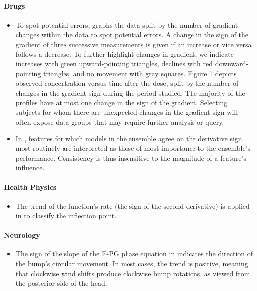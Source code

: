 \documentclass[11pt]{book}
\begin{document}
\paragraph{Drugs}
\begin{itemize}
\item To spot potential errors, \cite{dykstra2010visualization}
graphs the data split by the number of gradient changes within the
data to spot potential errors. A change in the sign of the gradient
of three successive measurements is given if an increase or vice versa
follows a decrease. To further highlight changes in gradient, we indicate
increases with green upward-pointing triangles, declines with red
downward-pointing triangles, and no movement with gray squares. Figure
1 depicts observed concentration versus time after the dose, split
by the number of changes in the gradient sign during the period studied.
The majority of the profiles have at most one change in the sign of
the gradient. Selecting subjects for whom there are unexpected changes
in the gradient sign will often expose data groups that may require
further analysis or query.
\item In \cite{brown2021general},
features for which models in the ensemble agree on the derivative
sign most routinely are interpreted as those of most importance to
the ensemble's performance. Consistency is thus insensitive
to the magnitude of a feature's influence.
\end{itemize}
\paragraph{Health Physics}
\begin{itemize}
\item The trend of the function's rate (the sign of the second derivative)
is applied in \cite{shende2019determination}
to classify the inflection point.
\end{itemize}
\paragraph{Neurology}
\begin{itemize}
\item The sign of the slope of the E-PG phase equation in \cite{okubo2020neural}
indicates the direction of the bump's circular movement.
In most cases, the trend is positive, meaning that clockwise wind
shifts produce clockwise bump rotations, as viewed from the posterior
side of the head.
\end{itemize}
\end{document}
